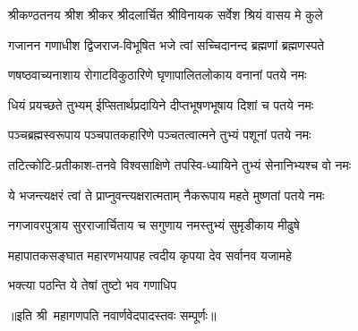 
\twolineshloka
{श्रीकण्ठतनय श्रीश श्रीकर श्रीदलार्चित}
{श्रीविनायक सर्वेश श्रियं वासय मे कुले}

\twolineshloka
{गजानन गणाधीश द्विजराज-विभूषित}
{भजे त्वां सच्चिदानन्द ब्रह्मणां ब्रह्मणस्पते}

\twolineshloka
{णषष्ठवाच्यनाशाय रोगाटविकुठारिणे}
{घृणापालितलोकाय वनानां पतये नमः}

\twolineshloka
{धियं प्रयच्छते तुभ्यम् ईप्सितार्थप्रदायिने}
{दीप्तभूषणभूषाय दिशां च पतये नमः}

\twolineshloka
{पञ्चब्रह्मस्वरूपाय पञ्चपातकहारिणे}
{पञ्चतत्वात्मने तुभ्यं पशूनां पतये नमः}

\twolineshloka
{तटित्कोटि-प्रतीकाश-तनवे विश्वसाक्षिणे}
{तपस्वि-ध्यायिने तुभ्यं सेनानिभ्यश्च वो नमः}

\twolineshloka
{ये भजन्त्यक्षरं त्वां ते प्राप्नुवन्त्यक्षरात्मताम्}
{नैकरूपाय महते मुष्णतां पतये नमः}

\twolineshloka
{नगजावरपुत्राय सुरराजार्चिताय च}
{सगुणाय नमस्तुभ्यं सुमृडीकाय मीढुषे}

\twolineshloka
{महापातकसङ्घात महारणभयापह}
{त्वदीय कृपया देव सर्वानव यजामहे}


{भक्त्या पठन्ति ये तेषां तुष्टो भव गणाधिप}

॥इति श्री~महागणपति नवार्णवेदपादस्तवः सम्पूर्णः॥